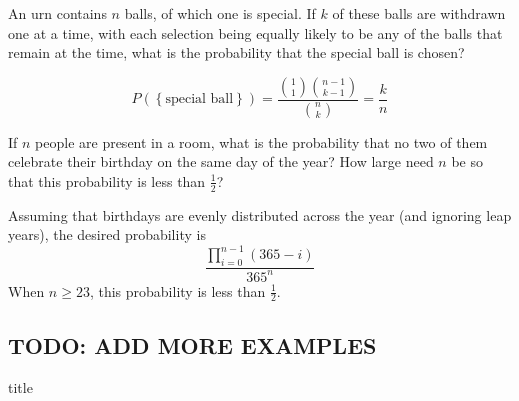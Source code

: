 \begin{changebar}
\begin{example}
    An urn contains $n$ balls, of which one is special. If $k$ of these balls are withdrawn one at a time, with each selection being equally likely to be any of the balls that remain at the time, what is the probability that the special ball is chosen?
\end{example}
\begin{solution}
    \[
        P(\left\{ \text{special ball} \right\}) = \frac{\binom{1}{1}\binom{n-1}{k-1}}{\binom{n}{k}} = \frac{k}{n}
    \]
\end{solution}
\end{changebar}
\begin{changebar}
\begin{example}
    If $n$ people are present in a room, what is the probability that no two of them celebrate their birthday on the same day of the year? How large need $n$ be so that this probability is less than $\frac{1}{2}$?
\end{example}
\begin{solution}
    Assuming that birthdays are evenly distributed across the year (and ignoring leap years), the desired probability is \[
        \frac{\prod^{n-1}_{i=0}(365-i)}{365^n}    
    \] When $n \geq 23$, this probability is less than $\frac{1}{2}$.
\end{solution}
\end{changebar}

\subsection{TODO: ADD MORE EXAMPLES}

title

\pagebreak
